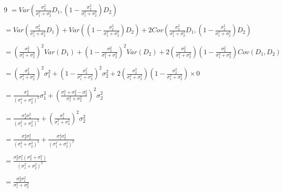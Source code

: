 \documentclass[12 pt]{article}
\begin{document}
\begin{exercise}{9}
    $= Var(\frac{\sigma_2^2}{\sigma_1^2 + \sigma_2^2}D_1, (1-\frac{\sigma_2^2}{\sigma_1^2 + \sigma_2^2})D_2)$

    $= Var(\frac{\sigma_2^2}{\sigma_1^2 + \sigma_2^2} D_1) + Var((1- \frac{\sigma_2^2}{\sigma_1^2 + \sigma_2^2})D_2) + 2 Cov(\frac{\sigma_2^2}{\sigma_1^2 + \sigma_2^2}D_1, (1 - \frac{\sigma_2^2}{\sigma_1^2 + \sigma_2^2}) D_2)$

    $= (\frac{\sigma_2^2}{\sigma_1^2 + \sigma_2^2})^2 Var(D_1) + (1 - \frac{\sigma_2^2}{\sigma_1^2 + \sigma_2^2})^2 Var(D_2) + 2 (\frac{\sigma_2^2}{\sigma_1^2 + \sigma_2^2})(1 - \frac{\sigma_2^2}{\sigma_1^2 + \sigma_2^2}) Cov(D_1, D_2)$

    $= (\frac{\sigma_2^2}{\sigma_1^2 + \sigma_2^2})^2 \sigma_1^2 + (1 - \frac{\sigma_2^2}{\sigma_1^2 + \sigma_2^2})^2 \sigma_2^2 + 2(\frac{\sigma_2^2}{\sigma_1^2 + \sigma_2^2})(1 - \frac{\sigma_2^2}{\sigma_1^2 + \sigma_2^2}) \times 0$

    $= \frac{\sigma_2^4}{(\sigma_1^2 + \sigma_2^2)^2} \sigma_1^2 + (\frac{\sigma_1^2 + \sigma_2^2 - \sigma_2^2}{\sigma_1^2 + \sigma_2^2})^2 \sigma_2^2$

    $= \frac{\sigma_2^4 \sigma_1^2}{(\sigma_1^2 + \sigma_2^2)^2} + (\frac{\sigma_1^2}{\sigma_1^2 + \sigma_2^2})^2 \sigma_2^2$

    $= \frac{\sigma_2^4 \sigma_1^2}{(\sigma_1^2 + \sigma_2^2)^2} + \frac{\sigma_1^4 \sigma_2^2}{(\sigma_1^2 + \sigma_2^2)^2}$

    $= \frac{\sigma_2^2 \sigma_1^2 (\sigma_2^2 + \sigma_1^2)}{(\sigma_1^2 + \sigma_2^2)^2}$

    $= \frac{\sigma_2^2 \sigma_1^2}{\sigma_1^2 + \sigma_2^2}$
    
    \hfill    
    \end{exercise}
\end{document}
